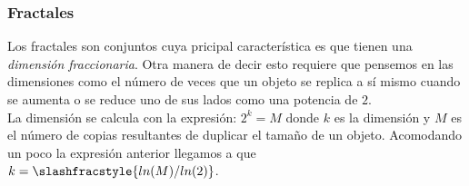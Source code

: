 \documentclass[letterpaper,12pt,oneside]{book}
\begin{document}






\subsubsection{Fractales}

Los fractales son conjuntos cuya pricipal característica es que tienen una \textit{dimensión fraccionaria}. Otra manera de decir esto requiere que pensemos en las dimensiones como el número de veces que un objeto se replica a sí mismo cuando se aumenta o se reduce uno de sus lados como una potencia de $2$.
\\

La dimensión se calcula con la expresión: $2^{k} = M$ donde $k$ es la dimensión y $M$ es el número de copias resultantes de duplicar el tamaño de un objeto. Acomodando un poco la expresión anterior llegamos a que $k = \slashfracstyle{ln(M) / ln(2)}$.
\\
\end{document}
